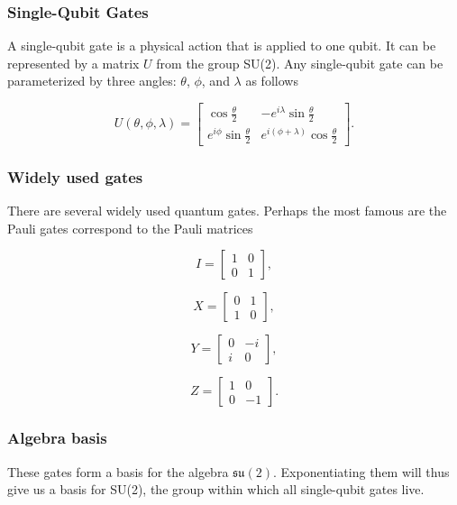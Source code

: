 \documentclass{beamer}
\begin{document}
\begin{frame}
\frametitle{Single-Qubit Gates}

A single-qubit gate is a physical action that is applied to one
qubit. It can be represented by a matrix $U$ from the group SU(2). Any
single-qubit gate can be parameterized by three angles: $\theta$,
$\phi$, and $\lambda$ as follows

\[
U(\theta,\phi,\lambda)=\begin{bmatrix}
\cos\frac{\theta}{2} & -e^{i\lambda}\sin\frac{\theta}{2}
\\
e^{i\phi}\sin\frac{\theta}{2} & e^{i(\phi+\lambda)}\cos\frac{\theta}{2}
\end{bmatrix}.
\]
\end{frame}

\begin{frame}
\frametitle{Widely used gates}

There are several widely used quantum gates. Perhaps the most famous are 
the Pauli gates correspond to the Pauli matrices

\[
I=\begin{bmatrix} 1 & 0 \\ 0 & 1 \end{bmatrix},
\]

\[
X =\begin{bmatrix} 0 & 1 \\ 1 & 0\end{bmatrix},
\]

\[
Y=\begin{bmatrix}0 & -i \\i & 0\end{bmatrix},
\]

\[
Z=\begin{bmatrix} 1 & 0 \\ 0 & -1\end{bmatrix}.
\]
\end{frame}

\begin{frame}
\frametitle{Algebra basis}

These gates form a basis for
the algebra $\mathfrak{su}(2)$. Exponentiating them will thus give us
a basis for SU(2), the group within which all single-qubit gates
live.
\end{frame}
\end{document}
